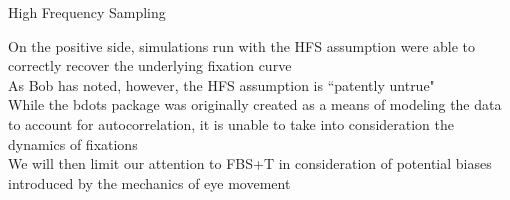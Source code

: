 \documentclass{beamer}
\begin{document}
\begin{frame}{High Frequency Sampling}



On the positive side, simulations run with the HFS assumption were able to correctly recover the underlying fixation curve \newline \\

As Bob has noted, however, the HFS assumption is ``patently untrue" \newline \\

While the bdots package was originally created as a means of modeling the data to account for autocorrelation, it is unable to take into consideration the dynamics of fixations \newline \\

We will then limit our attention to FBS+T in consideration of potential biases introduced by the mechanics of eye movement

\end{frame}
\end{document}
